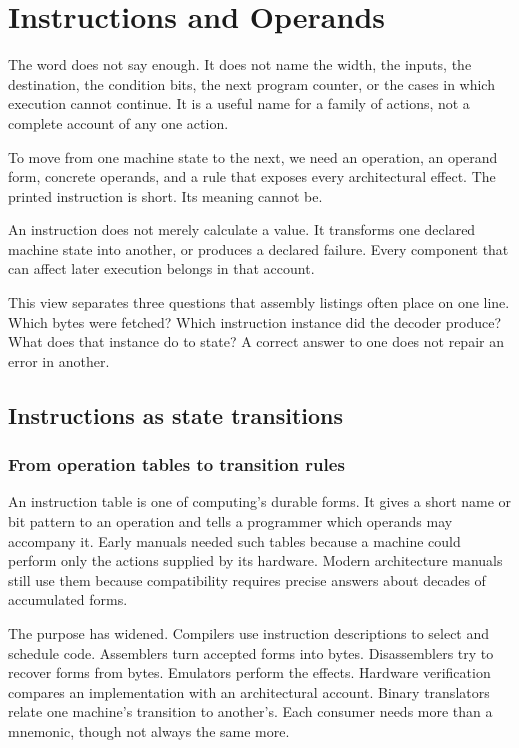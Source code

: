 \chapter{Instructions and Operands}
\label{ch:instructions-operands}

The word  does not say enough. It does not name the width, the
inputs, the destination, the condition bits, the next program counter, or the
cases in which execution cannot continue. It is a useful name for a family of
actions, not a complete account of any one action.

To move from one machine state to the next, we need an operation, an operand
form, concrete operands, and a rule that exposes every architectural effect.
The printed instruction is short. Its meaning cannot be.

\begin{keyidea}[title={An instruction meaning is a complete transition}]
An instruction does not merely calculate a value. It transforms one declared
machine state into another, or produces a declared failure. Every component
that can affect later execution belongs in that account.
\end{keyidea}

This view separates three questions that assembly listings often place on one
line. Which bytes were fetched? Which instruction instance did the decoder
produce? What does that instance do to state? A correct answer to one does not
repair an error in another.

\section{Instructions as state transitions}

\subsection{From operation tables to transition rules}

An instruction table is one of computing's durable forms. It gives a short
name or bit pattern to an operation and tells a programmer which operands may
accompany it. Early manuals needed such tables because a machine could perform
only the actions supplied by its hardware. Modern architecture manuals still
use them because compatibility requires precise answers about decades of
accumulated forms.

The purpose has widened. Compilers use instruction descriptions to select and
schedule code. Assemblers turn accepted forms into bytes. Disassemblers try to
recover forms from bytes. Emulators perform the effects. Hardware verification
compares an implementation with an architectural account. Binary translators
relate one machine's transition to another's. Each consumer needs more than a
mnemonic, though not always the same more.

